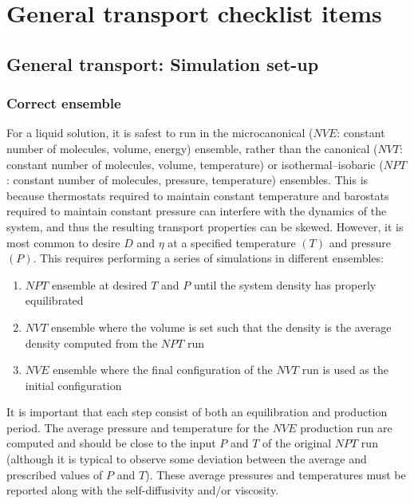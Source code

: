 \documentclass[9pt,bestpractices]{livecoms}
\begin{document}
\normalsize


\section{General transport checklist items} \label{sec:General}

\subsection{General transport: Simulation set-up} \label{sec:General Simulation Setup}

\subsubsection{Correct ensemble} \label{sec:General: Correct Ensemble}

For a liquid solution, it is safest to run in the microcanonical ($NVE$: constant number of molecules, volume, energy) ensemble, rather than the canonical ($NVT$: constant number of molecules, volume, temperature) or isothermal--isobaric ($NPT$: constant number of molecules, pressure, temperature) ensembles. This is because thermostats required to maintain constant temperature and barostats required to maintain constant pressure can interfere with the dynamics of the system, and thus the resulting transport properties can be skewed. However, it is most common to desire $D$ and $\eta$ at a specified temperature $(T)$ and pressure $(P)$. This requires performing a series of simulations in different ensembles:
\begin{enumerate}
	\item $NPT$ ensemble at desired $T$ and $P$ until the system density has properly equilibrated
	\item $NVT$ ensemble where the volume is set such that the density is the average density computed from the $NPT$ run
	\item $NVE$ ensemble where the final configuration of the $NVT$ run is used as the initial configuration
\end{enumerate}
It is important that each step consist of both an equilibration and production period. The average pressure and temperature for the $NVE$ production run are computed and should be close to the input $P$ and $T$ of the original $NPT$ run (although it is typical to observe some deviation between the average and prescribed values of $P$ and $T$). These average pressures and temperatures must be reported along with the self-diffusivity and/or viscosity.
\end{document}
